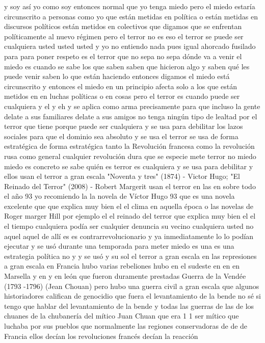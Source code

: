 y soy así yo como soy entonces normal que yo tenga miedo pero el miedo estaría circunscrito a personas como yo
que están metidas en política o están metidas en discursos políticos están metidos en colectivos que digamos que se enfrentan políticamente al nuevo régimen
pero el terror no es eso el terror se puede ser cualquiera usted usted usted y yo no entiendo nada pues igual
ahorcado fusilado para para poner respeto es el terror que no sepa no sepa dónde va a venir el miedo es cuando se sabe
los que saben saben que hicieron algo y saben qué les puede venir saben lo que están haciendo entonces digamos el miedo está circunscrito
y entonces el miedo en un principio afecta solo a los que están metidos en en luchas políticas o en cosas
pero el terror es cuando puede ser cualquiera y el y eh y se aplica como arma precisamente para que incluso
la gente delate a sus familiares delate a sus amigos no tenga ningún tipo de lealtad por el terror que tiene porque puede ser cualquiera
y se usa para debilitar los lazos sociales para que el dominio sea absoluto y se usa
el terror se usa de forma estratégica de forma estratégica tanto la Revolución francesa como la revolución rusa
como general cualquier revolución dura que se especie mete terror no miedo miedo es concreto se sabe quién es
terror es cualquiera y se usa para debilitar y ellos usan el terror a gran escala
"Noventa y tres" (1874) - Victor Hugo; "El Reinado del Terror" (2008) - Robert Margerit
usan el terror en las en sobre todo el año 93 yo recomiendo la la novela de Víctor Hugo 93
que es una novela excelente que que explica muy bien el el clima en aquella época o las novelas de Roger marger Hill
por ejemplo el el reinado del terror que explica muy bien el el el tiempo cualquiera podía ser cualquier denuncia
su vecino cualquiera usted no aquel aquel de allí es es contrarrevolucionario y ya inmediatamente
lo lo podían ejecutar y se usó durante una temporada para meter miedo es una es una estrategia política no y y se usó
y su sol el terror a gran escala en las represiones a gran escala en Francia hubo varias rebeliones
hubo en el sudeste en en en Marsella y en y en león que fueron duramente prestadas
Guerra de la Vendée (1793 -1796) (Jean Chouan)
pero hubo una guerra civil a gran escala que algunos historiadores califican de genocidio que fuera el levantamiento de la bende
no sé si tengo que hablar del levantamiento de la bende y todas las guerras de las de los chuanes de la chubanería del mítico Juan Chuan
que era 1 1 ser mítico que luchaba por sus pueblos que normalmente las regiones conservadoras de
de de Francia ellos decían los revoluciones francés decían la reacción
